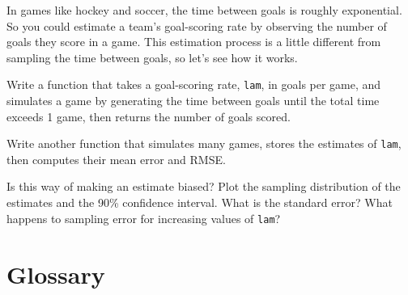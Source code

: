 \documentclass[12pt]{book}
\begin{document}
\begin{exercise}

In games like hockey and soccer, the time between goals is
roughly exponential.  So you could estimate a team's goal-scoring rate
by observing the number of goals they score in a game.  This
estimation process is a little different from sampling the time
between goals, so let's see how it works.

Write a function that takes a goal-scoring rate, {\tt lam}, in goals
per game, and simulates a game by generating the time between goals
until the total time exceeds 1 game, then returns the number of goals
scored.

Write another function that simulates many games, stores the
estimates of {\tt lam}, then computes their mean error and RMSE.

Is this way of making an estimate biased?  Plot the sampling
distribution of the estimates and the 90\% confidence interval.  What
is the standard error?  What happens to sampling error for increasing
values of {\tt lam}?

\end{exercise}


\section{Glossary}
\end{document}
